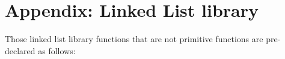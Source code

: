 \section*{Appendix: Linked List library}

Those linked list library functions that are not primitive functions
are pre-declared as follows:


